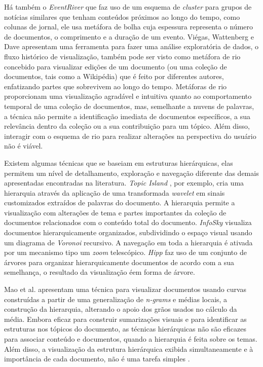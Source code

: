 Há também o \textit{EventRiver} \cite{luo2012eventriver} que faz uso de um esquema de \textit{cluster} para grupos de notícias similares que tenham conteúdos próximos ao longo do tempo, como colunas de jornal, ele usa metáfora de bolha cuja espessura representa o número de documentos, o comprimento e a duração de um evento. Viégas, Wattenberg e Dave  \cite{viegas2004studying} apresentam uma ferramenta para fazer uma análise exploratória de dados, o fluxo histórico de visualização, também pode ser visto como metáfora de rio concebido para visualizar edições de um documento (ou uma coleção de documentos, tais como a Wikipédia) que é feito por diferentes autores, enfatizando partes que sobrevivem ao longo do tempo. Metáforas de rio proporcionam uma visualização agradável e intuitiva quanto ao comportamento temporal de uma coleção de documentos, mas, semelhante a nuvens de palavras, a técnica não permite a identificação imediata de documentos específicos, a sua relevância dentro da coleção ou a sua contribuição para um tópico. Além disso, interagir com o esquema de rio para realizar alterações na perspectiva do usuário não é viável.

Existem algumas técnicas que se baseiam em estruturas hierárquicas, elas permitem um nível de detalhamento, exploração e navegação diferente das demais apresentadas encontradas na literatura. \textit{Topic Island} \cite{miller1998topic}, por exemplo, cria uma hierarquia através da aplicação de uma transformada \textit{wavelet} em sinais customizados extraídos de palavras do documento. A hierarquia permite a visualização com alterações de tema e partes importantes da coleção de documentos relacionados com o conteúdo total do documento.
\textit{InfoSky} \cite{andrews2002infosky} visualiza documentos hierarquicamente organizados, subdividindo o espaço visual usando um diagrama de \textit{Voronoi} recursivo. A navegação em toda a hierarquia é ativada por um mecanismo tipo um \textit{zoom} telescópico. \textit{Hipp }\cite{paulovich2008hipp} faz uso de um conjunto de árvores para organizar hierarquicamente documentos de acordo com a sua semelhança, o resultado da visualização éem forma de árvore. 

Mao et al.\cite{mao2007sequential} apresentam uma técnica para visualizar documentos usando curvas construídas a partir de uma generalização de \emph{n-grams} e médias locais, a construção da hierarquia, alterando o apoio dos grãos usados no cálculo da média. Embora eficaz para construir sumarizações visuais e para identificar as estruturas nos tópicos do documento, as técnicas hierárquicas não são eficazes para associar conteúdo e documentos, quando a hierarquia é feita sobre os temas. Além disso, a visualização da estrutura hierárquica exibida simultaneamente e à importância de cada documento, não é uma tarefa simples \cite{pagliosa2013mist}.


